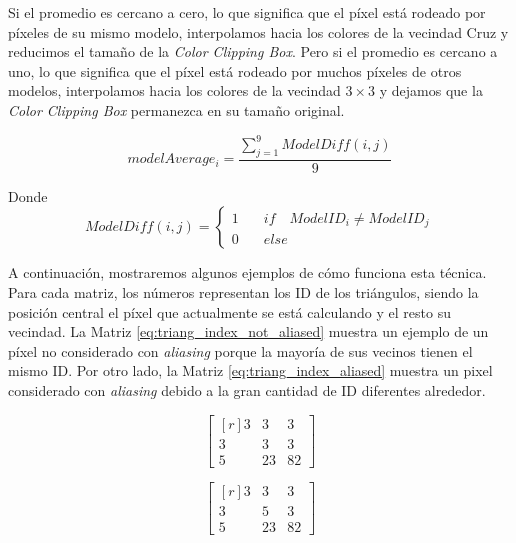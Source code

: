 \documentclass[pregrado]{tesis-usb} %
\begin{document}
Si el promedio es cercano a cero, lo que significa que el píxel está rodeado por píxeles de su mismo modelo, interpolamos hacia los colores de la vecindad Cruz y reducimos el tamaño de la \textit{Color Clipping Box}. Pero si el promedio es cercano a uno, lo que significa que el píxel está rodeado por muchos píxeles de otros modelos, interpolamos hacia los colores de la vecindad $3\times 3$ y dejamos que la \textit{Color Clipping Box} permanezca en su tamaño original.

\begin{equation}\label{eq:model_index_acc}
modelAverage_i = \frac{\sum\limits_{j=1}^{9} ModelDiff(i,j)}{9} 
\end{equation}

Donde
\begin{equation*}
ModelDiff(i,j) = \left\lbrace \begin{split}1\quad & if\quad ModelID_i \neq ModelID_j \\ 0\quad & else\end{split} \right.
\end{equation*}

A continuación, mostraremos algunos ejemplos de cómo funciona esta técnica. Para cada matriz, los números representan los ID de los triángulos, siendo la posición central el píxel que actualmente se está calculando y el resto su vecindad. La Matriz \ref{eq:triang_index_not_aliased} muestra un ejemplo de un píxel no considerado con \textit{aliasing} porque la mayoría de sus vecinos tienen el mismo ID. Por otro lado, la Matriz \ref{eq:triang_index_aliased} muestra un pixel considerado con \textit{aliasing} debido a la gran cantidad de ID diferentes alrededor.

\begin{equation}
\begin{bmatrix*}[r]\label{eq:triang_index_not_aliased}
3 &  3 & 3 \\
3 &  3 & 3 \\
5 &  23 & 82
\end{bmatrix*}
\end{equation}

\begin{equation}
\begin{bmatrix*}[r]\label{eq:triang_index_aliased}
3 &  3 & 3 \\
3 &  5 & 3 \\
5 &  23 & 82
\end{bmatrix*}
\end{equation}
\end{document}

